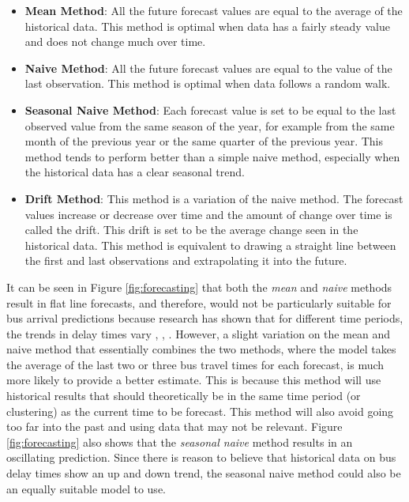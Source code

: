 \begin{itemize}
    \item \textbf{Mean Method}: All the future forecast values are equal to the average of the historical data. This method is optimal when data has a fairly steady value and does not change much over time.
    \item \textbf{Naive Method}: All the future forecast values are equal to the value of the last observation. This method is optimal when data follows a random walk.
    \item \textbf{Seasonal Naive Method}: Each forecast value is set to be equal to the last observed value from the same season of the year, for example from the same month of the previous year or the same quarter of the previous year. This method tends to perform better than a simple naive method, especially when the historical data has a clear seasonal trend. 
    \item \textbf{Drift Method}: This method is a variation of the naive method. The forecast values increase or decrease over time and the amount of change over time is called the drift. This drift is set to be the average change seen in the historical data. This method is equivalent to drawing a straight line between the first and last observations and extrapolating it into the future. 
\end{itemize}

It can be seen in Figure \ref{fig:forecasting} that both the \textit{mean} and \textit{naive} methods result in flat line forecasts, and therefore, would not be particularly suitable for bus arrival predictions because research has shown that for different time periods, the trends in delay times vary \cite{dynamic-gps}, \cite{ann-prediction}, \cite{smart-public-transport}. However, a slight variation on the mean and naive method that essentially combines the two methods, where the model takes the average of the last two or three bus travel times for each forecast, is much more likely to provide a better estimate. This is because this method will use historical results that should theoretically be in the same time period (or clustering) as the current time to be forecast. This method will also avoid going too far into the past and using data that may not be relevant. Figure \ref{fig:forecasting} also shows that the \textit{seasonal naive} method results in an oscillating prediction. Since there is reason to believe that historical data on bus delay times show an up and down trend, the seasonal naive method could also be an equally suitable model to use.

